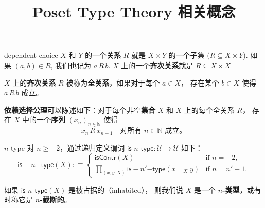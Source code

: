 \documentclass{beamer}
\title{Poset Type Theory 相关概念}
\date{}
\newcommand{\UU}{\mathcal{U}}
\begin{document}
\begin{frame}
    \titlepage
\end{frame}

\begin{frame}{dependent choice \cite{hottbook}}
$X$ 和 $Y$ 的一个\textbf{关系} $R$ 就是 $X \times Y$ 的一个子集 ($R \subseteq X\times Y$). 如果 $(a,b)\in R$, 我们也记为 $a\,R\,b$. $X$ 上的一个\textbf{齐次关系}就是 $R \subseteq X\times X$
\vspace{5mm}

$X$ 上的\textbf{齐次关系} $R$ 被称为\textbf{全关系}，如果对于每个 $a \in X$，
存在某个 $b \in X$ 使得 $a\,R\,b$ 成立。

\vspace{5mm}
\textbf{依赖选择公理}可以陈述如下：对于每个非空\textbf{集合} $X$ 和 $X$ 上的每个全关系 $R$，
存在 $X$ 中的一个\textbf{序列} $(x_n)_{n \in \mathbb{N}}$ 使得
\[
x_n\,R\,x_{n+1} \quad \text{对所有 } n \in \mathbb{N} \text{ 成立。}
\]
\end{frame}

\begin{frame}{$n$-type \cite{hottbook}}
对 $n \geq -2$，通过递归定义谓词 $\mathsf{is}\text{-}n\text{-}\mathsf{type} : \UU \to \UU$ 如下：
\[
\mathsf{is-}n\mathsf{-type}(X) :\equiv 
\begin{cases} 
\mathsf{isContr}(X) & \text{if } n = -2, \\
\prod_{(x,y:X)} \mathsf{is-}n'\mathsf{-type}(x =_X y) & \text{if } n = n' + 1.
\end{cases}
\]

\vspace{1em}

如果 $\mathsf{is}\text{-}n\text{-}\mathsf{type}(X)$ 是被占据的（inhabited），
则我们说 $X$ 是一个 \textbf{$n$-类型}，或有时称它是 \textbf{$n$-截断的}。
\end{frame}
\end{document}
